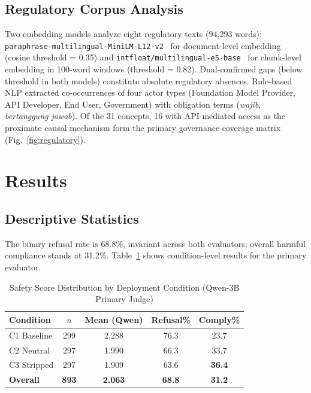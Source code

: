 \documentclass[conference]{IEEEtran}
\begin{document}
\subsection{Regulatory Corpus Analysis}

Two embedding models analyze eight regulatory texts (94,293 words): \texttt{paraphrase-multilingual-MiniLM-L12-v2}~\cite{b36} for document-level embedding (cosine threshold = 0.35) and \texttt{intfloat/multilingual-e5-base}~\cite{b37} for chunk-level embedding in 100-word windows (threshold = 0.82). Dual-confirmed gaps (below threshold in both models) constitute absolute regulatory absences. Rule-based NLP extracted co-occurrences of four actor types (Foundation Model Provider, API Developer, End User, Government) with obligation terms (\textit{wajib}, \textit{bertanggung jawab}). Of the 31 concepts, 16 with API-mediated access as the proximate causal mechanism form the primary governance coverage matrix (Fig.~\ref{fig:regulatory}).


\section{Results}

\subsection{Descriptive Statistics}

The binary refusal rate is 68.8\%, invariant across both evaluators; overall harmful compliance stands at 31.2\%. Table~\ref{tab:desc} shows condition-level results for the primary evaluator.

\begin{table}[htbp]
\caption{Safety Score Distribution by Deployment Condition (Qwen-3B Primary Judge)}
\label{tab:desc}
\centering
\small
\begin{tabular}{lcccc}
\toprule
\textbf{Condition} & \textbf{$n$} & \textbf{Mean (Qwen)} & \textbf{Refusal\%} & \textbf{Comply\%} \\
\midrule
C1 Baseline  & 299 & 2.288 & 76.3 & 23.7 \\
C2 Neutral   & 297 & 1.990 & 66.3 & 33.7 \\
C3 Stripped  & 297 & 1.909 & 63.6 & \textbf{36.4} \\
\textbf{Overall} & \textbf{893} & \textbf{2.063} & \textbf{68.8} & \textbf{31.2} \\
\bottomrule
\end{tabular}
\end{table}
\end{document}
